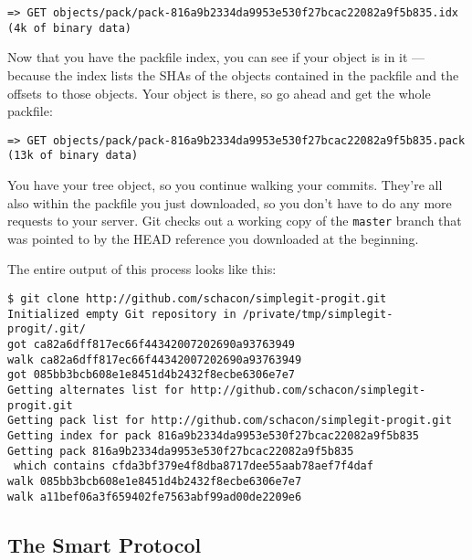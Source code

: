 \documentclass[a4paper]{book}
\begin{document}
\begin{shaded}\begin{verbatim}
=> GET objects/pack/pack-816a9b2334da9953e530f27bcac22082a9f5b835.idx
(4k of binary data)
\end{verbatim}\end{shaded}

Now that you have the packfile index, you can see if your object is in it --- because the index lists the SHAs of the objects contained in the packfile and the offsets to those objects. Your object is there, so go ahead and get the whole packfile:

\begin{shaded}\begin{verbatim}
=> GET objects/pack/pack-816a9b2334da9953e530f27bcac22082a9f5b835.pack
(13k of binary data)
\end{verbatim}\end{shaded}

You have your tree object, so you continue walking your commits. They're all also within the packfile you just downloaded, so you don't have to do any more requests to your server. Git checks out a working copy of the \texttt{master} branch that was pointed to by the HEAD reference you downloaded at the beginning.

The entire output of this process looks like this:

\begin{shaded}\begin{verbatim}
$ git clone http://github.com/schacon/simplegit-progit.git
Initialized empty Git repository in /private/tmp/simplegit-progit/.git/
got ca82a6dff817ec66f44342007202690a93763949
walk ca82a6dff817ec66f44342007202690a93763949
got 085bb3bcb608e1e8451d4b2432f8ecbe6306e7e7
Getting alternates list for http://github.com/schacon/simplegit-progit.git
Getting pack list for http://github.com/schacon/simplegit-progit.git
Getting index for pack 816a9b2334da9953e530f27bcac22082a9f5b835
Getting pack 816a9b2334da9953e530f27bcac22082a9f5b835
 which contains cfda3bf379e4f8dba8717dee55aab78aef7f4daf
walk 085bb3bcb608e1e8451d4b2432f8ecbe6306e7e7
walk a11bef06a3f659402fe7563abf99ad00de2209e6
\end{verbatim}\end{shaded}

\subsection{The Smart Protocol}
\end{document}
